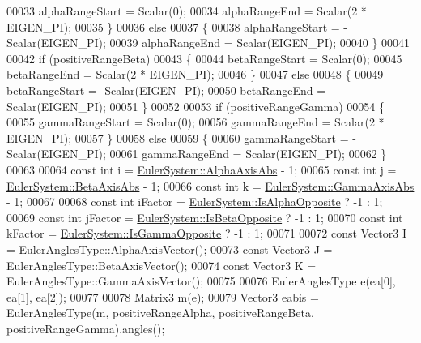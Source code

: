 \begin{DoxyCode}
00033     alphaRangeStart = Scalar(0);
00034     alphaRangeEnd = Scalar(2 * EIGEN\_PI);
00035   \}
00036   \textcolor{keywordflow}{else}
00037   \{
00038     alphaRangeStart = -Scalar(EIGEN\_PI);
00039     alphaRangeEnd = Scalar(EIGEN\_PI);
00040   \}
00041   
00042   \textcolor{keywordflow}{if} (positiveRangeBeta)
00043   \{
00044     betaRangeStart = Scalar(0);
00045     betaRangeEnd = Scalar(2 * EIGEN\_PI);
00046   \}
00047   \textcolor{keywordflow}{else}
00048   \{
00049     betaRangeStart = -Scalar(EIGEN\_PI);
00050     betaRangeEnd = Scalar(EIGEN\_PI);
00051   \}
00052   
00053   \textcolor{keywordflow}{if} (positiveRangeGamma)
00054   \{
00055     gammaRangeStart = Scalar(0);
00056     gammaRangeEnd = Scalar(2 * EIGEN\_PI);
00057   \}
00058   \textcolor{keywordflow}{else}
00059   \{
00060     gammaRangeStart = -Scalar(EIGEN\_PI);
00061     gammaRangeEnd = Scalar(EIGEN\_PI);
00062   \}
00063   
00064   \textcolor{keyword}{const} \textcolor{keywordtype}{int} i = \hyperlink{class_eigen_1_1_euler_system_ab1604e0e8eb9b72fa937236fdb9fd68da54814e9f1958769932e1f1a2047701b8}{EulerSystem::AlphaAxisAbs} - 1;
00065   \textcolor{keyword}{const} \textcolor{keywordtype}{int} j = \hyperlink{class_eigen_1_1_euler_system_ab1604e0e8eb9b72fa937236fdb9fd68daaea3c35e3fd2cab857f0b37feaa80c05}{EulerSystem::BetaAxisAbs} - 1;
00066   \textcolor{keyword}{const} \textcolor{keywordtype}{int} k = \hyperlink{class_eigen_1_1_euler_system_ab1604e0e8eb9b72fa937236fdb9fd68daef2019be264b8fb5dbd4a5ca4f118b29}{EulerSystem::GammaAxisAbs} - 1;
00067   
00068   \textcolor{keyword}{const} \textcolor{keywordtype}{int} iFactor = \hyperlink{class_eigen_1_1_euler_system_ab1604e0e8eb9b72fa937236fdb9fd68daac88718d0bd48e25e3e715af12342de7}{EulerSystem::IsAlphaOpposite} ? -1 : 1;
00069   \textcolor{keyword}{const} \textcolor{keywordtype}{int} jFactor = \hyperlink{class_eigen_1_1_euler_system_ab1604e0e8eb9b72fa937236fdb9fd68da659596aeadc17ade7dff5b8740c04ca8}{EulerSystem::IsBetaOpposite} ? -1 : 1;
00070   \textcolor{keyword}{const} \textcolor{keywordtype}{int} kFactor = \hyperlink{class_eigen_1_1_euler_system_ab1604e0e8eb9b72fa937236fdb9fd68da6779029ac21bd5102818c8ea8cf6c031}{EulerSystem::IsGammaOpposite} ? -1 : 1;
00071   
00072   \textcolor{keyword}{const} Vector3 I = EulerAnglesType::AlphaAxisVector();
00073   \textcolor{keyword}{const} Vector3 J = EulerAnglesType::BetaAxisVector();
00074   \textcolor{keyword}{const} Vector3 K = EulerAnglesType::GammaAxisVector();
00075   
00076   EulerAnglesType e(ea[0], ea[1], ea[2]);
00077   
00078   Matrix3 m(e);
00079   Vector3 eabis = EulerAnglesType(m, positiveRangeAlpha, positiveRangeBeta, positiveRangeGamma).angles();

\end{DoxyCode}
